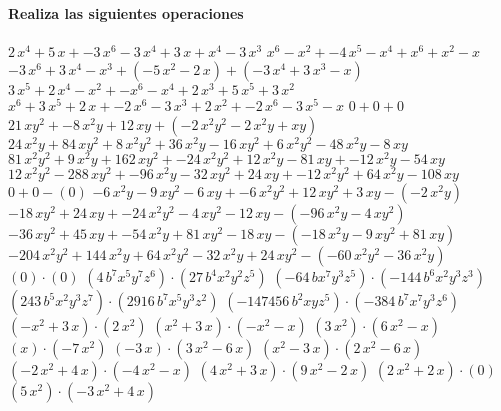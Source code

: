 \paragraph{ Realiza las siguientes operaciones } \subitem [0]$ 2 \, x^{4} + 5 \, x + -3 \, x^{6} - 3 \, x^{4} + 3 \, x + x^{4} - 3 \, x^{3} $ \subitem [1]$ x^{6} - x^{2} + -4 \, x^{5} - x^{4} + x^{6} + x^{2} - x $ \subitem [2]$ -3 \, x^{6} + 3 \, x^{4} - x^{3} + ( -5 \, x^{2} - 2 \, x ) + ( -3 \, x^{4} + 3 \, x^{3} - x ) $ \subitem [3]$ 3 \, x^{5} + 2 \, x^{4} - x^{2} + -x^{6} - x^{4} + 2 \, x^{3} + 5 \, x^{5} + 3 \, x^{2} $ \subitem [4]$ x^{6} + 3 \, x^{5} + 2 \, x + -2 \, x^{6} - 3 \, x^{3} + 2 \, x^{2} + -2 \, x^{6} - 3 \, x^{5} - x $ \subitem [0]$ 0 + 0 + 0 $ \subitem [1]$ 21 \, x y^{2} + -8 \, x^{2} y + 12 \, x y + ( -2 \, x^{2} y^{2} - 2 \, x^{2} y + x y ) $ \subitem [2]$ 24 \, x^{2} y + 84 \, x y^{2} + 8 \, x^{2} y^{2} + 36 \, x^{2} y - 16 \, x y^{2} + 6 \, x^{2} y^{2} - 48 \, x^{2} y - 8 \, x y $ \subitem [3]$ 81 \, x^{2} y^{2} + 9 \, x^{2} y + 162 \, x y^{2} + -24 \, x^{2} y^{2} + 12 \, x^{2} y - 81 \, x y + -12 \, x^{2} y - 54 \, x y $ \subitem [4]$ 12 \, x^{2} y^{2} - 288 \, x y^{2} + -96 \, x^{2} y - 32 \, x y^{2} + 24 \, x y + -12 \, x^{2} y^{2} + 64 \, x^{2} y - 108 \, x y $ \subitem [0]$ 0 + 0 - ( 0 ) $ \subitem [1]$ -6 \, x^{2} y - 9 \, x y^{2} - 6 \, x y + -6 \, x^{2} y^{2} + 12 \, x y^{2} + 3 \, x y - ( -2 \, x^{2} y ) $ \subitem [2]$ -18 \, x y^{2} + 24 \, x y + -24 \, x^{2} y^{2} - 4 \, x y^{2} - 12 \, x y - ( -96 \, x^{2} y - 4 \, x y^{2} ) $ \subitem [3]$ -36 \, x y^{2} + 45 \, x y + -54 \, x^{2} y + 81 \, x y^{2} - 18 \, x y - ( -18 \, x^{2} y - 9 \, x y^{2} + 81 \, x y ) $ \subitem [4]$ -204 \, x^{2} y^{2} + 144 \, x^{2} y + 64 \, x^{2} y^{2} - 32 \, x^{2} y + 24 \, x y^{2} - ( -60 \, x^{2} y^{2} - 36 \, x^{2} y ) $ \subitem [0]$ ( 0 ) · ( 0 )$ \subitem [1]$ ( 4 \, b^{7} x^{5} y^{7} z^{6} ) · ( 27 \, b^{4} x^{2} y^{2} z^{5} )$ \subitem [2]$ ( -64 \, b x^{7} y^{3} z^{5} ) · ( -144 \, b^{6} x^{2} y^{3} z^{3} )$ \subitem [3]$ ( 243 \, b^{5} x^{2} y^{3} z^{7} ) · ( 2916 \, b^{7} x^{5} y^{3} z^{2} )$ \subitem [4]$ ( -147456 \, b^{2} x y z^{5} ) · ( -384 \, b^{7} x^{7} y^{3} z^{6} )$ \subitem [0]$ ( -x^{2} + 3 \, x ) · ( 2 \, x^{2} )$ \subitem [1]$ ( x^{2} + 3 \, x ) · ( -x^{2} - x )$ \subitem [2]$ ( 3 \, x^{2} ) · ( 6 \, x^{2} - x )$ \subitem [3]$ ( x ) · ( -7 \, x^{2} )$ \subitem [4]$ ( -3 \, x ) · ( 3 \, x^{2} - 6 \, x )$ \subitem [0]$ ( x^{2} - 3 \, x ) · ( 2 \, x^{2} - 6 \, x )$ \subitem [1]$ ( -2 \, x^{2} + 4 \, x ) · ( -4 \, x^{2} - x )$ \subitem [2]$ ( 4 \, x^{2} + 3 \, x ) · ( 9 \, x^{2} - 2 \, x )$ \subitem [3]$ ( 2 \, x^{2} + 2 \, x ) · ( 0 )$ \subitem [4]$ ( 5 \, x^{2} ) · ( -3 \, x^{2} + 4 \, x )$